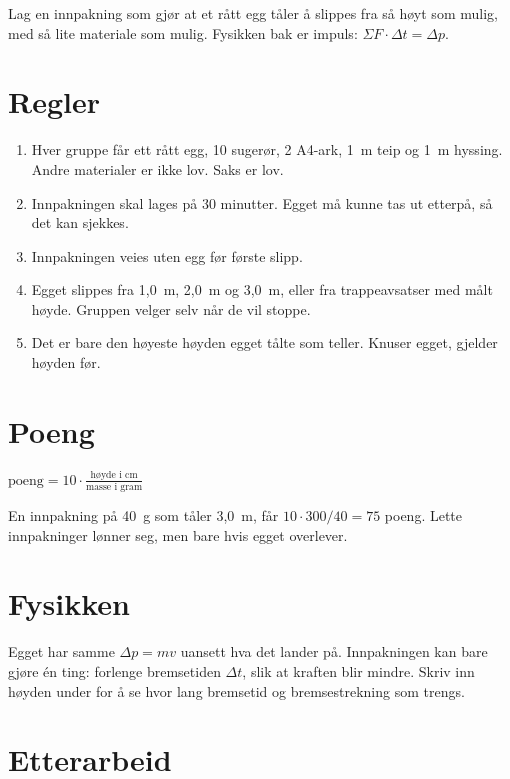 \documentclass[11pt]{article}
\begin{document}

Lag en innpakning som gjør at et rått egg tåler å slippes fra så høyt som mulig, med så lite materiale som mulig. Fysikken bak er impuls: $ΣF \cdot Δt = Δp$.

\section*{Regler}

\begin{enumerate}
\item Hver gruppe får ett rått egg, 10 sugerør, 2 A4-ark, 1~m teip og 1~m hyssing. Andre materialer er ikke lov. Saks er lov.
\item Innpakningen skal lages på 30 minutter. Egget må kunne tas ut etterpå, så det kan sjekkes.
\item Innpakningen veies uten egg før første slipp.
\item Egget slippes fra 1,0~m, 2,0~m og 3,0~m, eller fra trappeavsatser med målt høyde. Gruppen velger selv når de vil stoppe.
\item Det er bare den høyeste høyden egget tålte som teller. Knuser egget, gjelder høyden før.
\end{enumerate}

\section*{Poeng}

$\displaystyle \text{poeng} = 10 \cdot \frac{\text{høyde i cm}}{\text{masse i gram}}$

En innpakning på 40~g som tåler 3,0~m, får $10 \cdot 300 / 40 = 75$ poeng. Lette innpakninger lønner seg, men bare hvis egget overlever.

\section*{Fysikken}

Egget har samme $Δp = mv$ uansett hva det lander på. Innpakningen kan bare gjøre én ting: forlenge bremsetiden $Δt$, slik at kraften blir mindre. Skriv inn høyden under for å se hvor lang bremsetid og bremsestrekning som trengs.

\section*{Etterarbeid}
\end{document}
